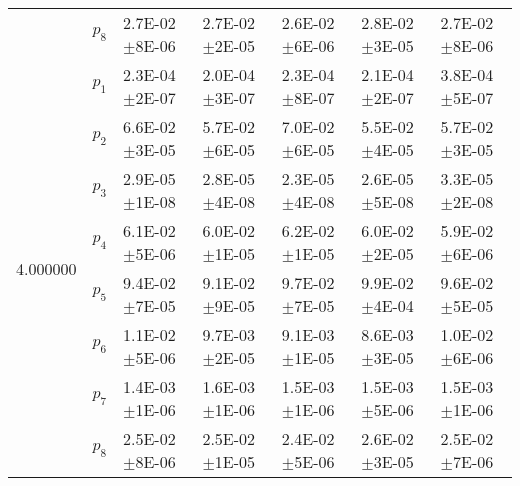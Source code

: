 \begin{tabular}{lllllll}
 & $p_8$ & 2.7E-02\(\pm\)8E-06 & 2.7E-02\(\pm\)2E-05 & 2.6E-02\(\pm\)6E-06 & 2.8E-02\(\pm\)3E-05 & 2.7E-02\(\pm\)8E-06 \\
\multirow[c]{8}{*}{4.000000} & $p_1$ & 2.3E-04\(\pm\)2E-07 & 2.0E-04\(\pm\)3E-07 & 2.3E-04\(\pm\)8E-07 & 2.1E-04\(\pm\)2E-07 & 3.8E-04\(\pm\)5E-07 \\
 & $p_2$ & 6.6E-02\(\pm\)3E-05 & 5.7E-02\(\pm\)6E-05 & 7.0E-02\(\pm\)6E-05 & 5.5E-02\(\pm\)4E-05 & 5.7E-02\(\pm\)3E-05 \\
 & $p_3$ & 2.9E-05\(\pm\)1E-08 & 2.8E-05\(\pm\)4E-08 & 2.3E-05\(\pm\)4E-08 & 2.6E-05\(\pm\)5E-08 & 3.3E-05\(\pm\)2E-08 \\
 & $p_4$ & 6.1E-02\(\pm\)5E-06 & 6.0E-02\(\pm\)1E-05 & 6.2E-02\(\pm\)1E-05 & 6.0E-02\(\pm\)2E-05 & 5.9E-02\(\pm\)6E-06 \\
 & $p_5$ & 9.4E-02\(\pm\)7E-05 & 9.1E-02\(\pm\)9E-05 & 9.7E-02\(\pm\)7E-05 & 9.9E-02\(\pm\)4E-04 & 9.6E-02\(\pm\)5E-05 \\
 & $p_6$ & 1.1E-02\(\pm\)5E-06 & 9.7E-03\(\pm\)2E-05 & 9.1E-03\(\pm\)1E-05 & 8.6E-03\(\pm\)3E-05 & 1.0E-02\(\pm\)6E-06 \\
 & $p_7$ & 1.4E-03\(\pm\)1E-06 & 1.6E-03\(\pm\)1E-06 & 1.5E-03\(\pm\)1E-06 & 1.5E-03\(\pm\)5E-06 & 1.5E-03\(\pm\)1E-06 \\
 & $p_8$ & 2.5E-02\(\pm\)8E-06 & 2.5E-02\(\pm\)1E-05 & 2.4E-02\(\pm\)5E-06 & 2.6E-02\(\pm\)3E-05 & 2.5E-02\(\pm\)7E-06 \\
\end{tabular}
